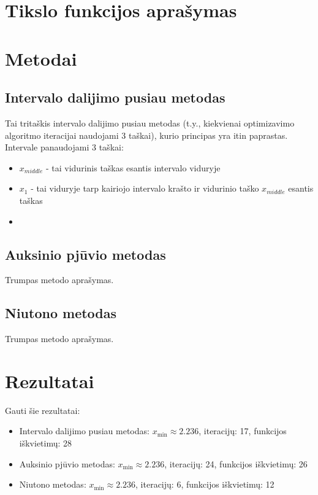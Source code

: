 \documentclass[lithuanian,a4paper,12pt]{article}
\begin{document}
\section{Tikslo funkcijos aprašymas}


\section{Metodai}
\subsection{Intervalo dalijimo pusiau metodas}
Tai tritaškis intervalo dalijimo pusiau metodas (t.y., kiekvienai optimizavimo algoritmo iteracijai naudojami 3 taškai), kurio principas yra itin paprastas. Intervale panaudojami 3 taškai:
\begin{itemize}
    \item $x_{middle}$ - tai vidurinis taškas esantis intervalo viduryje
    \item $x_1$ - tai viduryje tarp kairiojo intervalo krašto ir vidurinio taško $x_{middle}$ esantis taškas
    \item 
\end{itemize}

\subsection{Auksinio pjūvio metodas}
Trumpas metodo aprašymas.

\subsection{Niutono metodas}
Trumpas metodo aprašymas.

\section{Rezultatai}
Gauti šie rezultatai:

\begin{itemize}
    \item Intervalo dalijimo pusiau metodas: 
        $x_{\min} \approx 2.236$, iteracijų: 17, funkcijos iškvietimų: 28
    \item Auksinio pjūvio metodas:
        $x_{\min} \approx 2.236$, iteracijų: 24, funkcijos iškvietimų: 26
    \item Niutono metodas:
        $x_{\min} \approx 2.236$, iteracijų: 6, funkcijos iškvietimų: 12
\end{itemize}
\end{document}
